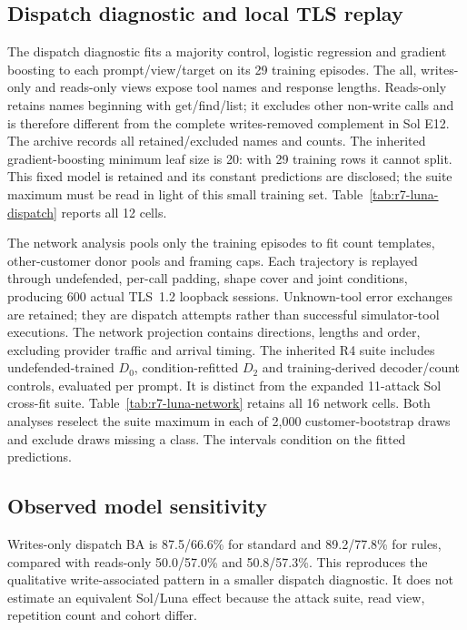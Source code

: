 \subsection{Dispatch diagnostic and local TLS replay}
The dispatch diagnostic fits a majority control, logistic regression and gradient boosting to each prompt/view/target on its 29 training episodes. The all, writes-only and reads-only views expose tool names and response lengths. Reads-only retains names beginning with get/find/list; it excludes other non-write calls and is therefore different from the complete writes-removed complement in Sol E12. The archive records all retained/excluded names and counts. The inherited gradient-boosting minimum leaf size is 20: with 29 training rows it cannot split. This fixed model is retained and its constant predictions are disclosed; the suite maximum must be read in light of this small training set. Table~\ref{tab:r7-luna-dispatch} reports all 12 cells.

The network analysis pools only the training episodes to fit count templates, other-customer donor pools and framing caps. Each trajectory is replayed through undefended, per-call padding, shape cover and joint conditions, producing 600 actual TLS~1.2 loopback sessions. Unknown-tool error exchanges are retained; they are dispatch attempts rather than successful simulator-tool executions. The network projection contains directions, lengths and order, excluding provider traffic and arrival timing. The inherited R4 suite includes undefended-trained $D_0$, condition-refitted $D_2$ and training-derived decoder/count controls, evaluated per prompt. It is distinct from the expanded 11-attack Sol cross-fit suite. Table~\ref{tab:r7-luna-network} retains all 16 network cells. Both analyses reselect the suite maximum in each of 2,000 customer-bootstrap draws and exclude draws missing a class. The intervals condition on the fitted predictions.




\subsection{Observed model sensitivity}
Writes-only dispatch BA is 87.5/66.6\% for standard and 89.2/77.8\% for rules, compared with reads-only 50.0/57.0\% and 50.8/57.3\%. This reproduces the qualitative write-associated pattern in a smaller dispatch diagnostic. It does not estimate an equivalent Sol/Luna effect because the attack suite, read view, repetition count and cohort differ.

